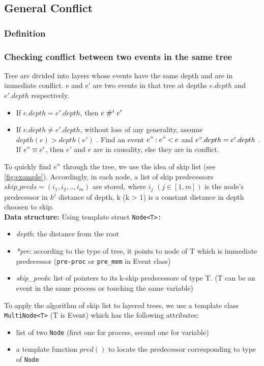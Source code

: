 \documentclass{llncs}
\begin{document}
\subsection{General Conflict}
\subsubsection{Definition}
\subsubsection{Checking conflict between two events in the same tree}
Tree are divided into layers whose events have the same depth and are in immediate conflict.
e and e' are two events in that tree at depths $e.depth$ and $e'.depth$ respectively.
\begin{itemize}
	\item
	If $e.depth = e'.depth$, then $e \mathrel{\#^i_{}} e'$
	\item
	If $e.depth \neq e'.depth$, without loss of any generality, assume $ depth(e) > depth(e')$ . Find an event $e": e" < e$ and $e".depth = e'.depth$ . If $e" \equiv e'$, then $e'$ and $e$ are in causality, else they are in conflict.
\end{itemize}


To quickly find $e"$ through the tree, we use the idea of skip list
(see \ref{fig:example}).
Accordingly, in each node, a list of skip predecessors $
skip\_preds = (i_1, i_2,..,i_m)$ are stored, where $i_j$ $(j \in [1,m] )$ is the
node's predecessor in $k^{j}$ distance of depth, k (k > 1) is a constant
distance in depth choosen to skip.\\

\noindent
\textbf{Data structure:}
Using template struct \verb!Node<T>:!
\begin{itemize}
	\item \textit{depth}: the distance from the root
	\item \textit{*pre}: according to the type of tree, it points to node of T which is immediate predecessor (\verb!pre-proc! or \verb!pre_mem! in Event class)
	\item \textit{skip\_preds}: list of pointers to its k-skip predecessors of type T.	
	(T can be an event in the same process or touching the same variable)
\end{itemize}

To apply the algorithm of skip list to layered trees, we use a template class \verb!MultiNode<T>! (T is Event) which has the following attributes:
\begin{itemize}
	\item list of two \verb!Node! (first one for process, second one for variable)
	\item a template function $pred()$ to locate the predecessor corresponding to type of \verb!Node!
\end{itemize}
\end{document}
